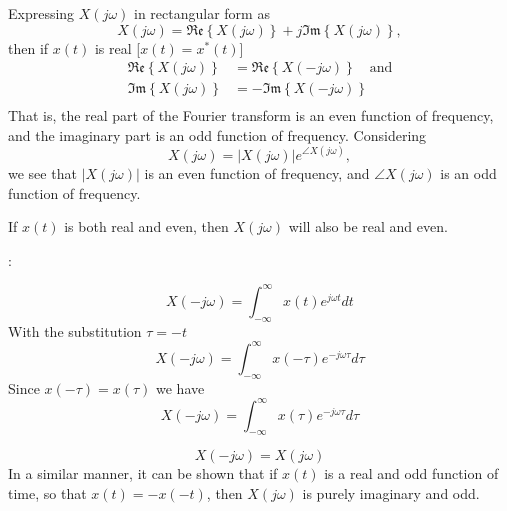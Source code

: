 \begin{frame}
    Expressing $X(j\omega)$ in rectangular form as
    \begin{equation*}
        X(j\omega)
        = \mathfrak{Re}\left\{X(j\omega)\right\} + j\mathfrak{Im}\left\{X(j\omega)\right\},
    \end{equation*}
    then if $x(t)$ is real [$x(t) = x^\ast(t)$]
    \begin{align*}
        \mathfrak{Re}\left\{X(j\omega)\right\} &= \mathfrak{Re}\left\{X(-j\omega)\right\}\quad \text{and}\\
        \mathfrak{Im}\left\{X(j\omega)\right\} &= -\mathfrak{Im}\left\{X(-j\omega)\right\}\\
    \end{align*}
That is, the real part of the Fourier transform is an even function of frequency, and the imaginary part is an odd function of frequency.
\pause
Considering
    \begin{equation*}
        X(j\omega) = |X(j\omega)|e^{\angle X(j\omega)},
    \end{equation*}
    we see that $|X(j\omega)|$ is an even function of frequency, and $\angle X(j\omega)$ is an odd function of frequency.


\end{frame}

\begin{frame}
    If $x(t)$ is both real and even, then $X(j\omega)$ will also be real and even.\par
    :\par
{}
{
    \begin{equation*}
        X(-j\omega) = \int_{-\infty}^{\infty} x(t)e^{j\omega t}dt
    \end{equation*}
    \pause
    With the substitution $\tau = -t$
    \begin{equation*}
        X(-j\omega) = \int_{-\infty}^{\infty} x(-\tau)e^{-j\omega \tau}d\tau
    \end{equation*}
    Since $x(-\tau) = x(\tau)$ we have
    \begin{equation*}
        X(-j\omega) = \int_{-\infty}^{\infty} x(\tau)e^{-j\omega \tau}d\tau
    \end{equation*}

    \begin{equation*}
        X(-j\omega) = X(j\omega)
    \end{equation*}
    In a similar manner, it can be shown that if $x(t)$ is a real and odd function of time, so that $x(t) = - x(- t)$, then $X(j\omega)$ is purely imaginary and odd.

}
\end{frame}


